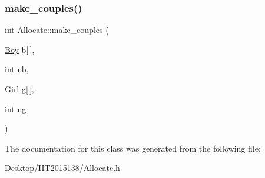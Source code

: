 \subsubsection{\texorpdfstring{make\+\_\+couples()}{make\_couples()}}
{\footnotesize\ttfamily int Allocate\+::make\+\_\+couples (\begin{DoxyParamCaption}\item[{\hyperlink{classBoy}{Boy}}]{b\mbox{[}$\,$\mbox{]},  }\item[{int}]{nb,  }\item[{\hyperlink{classGirl}{Girl}}]{g\mbox{[}$\,$\mbox{]},  }\item[{int}]{ng }\end{DoxyParamCaption})\hspace{0.3cm}{\ttfamily [inline]}}



The documentation for this class was generated from the following file\+:\begin{DoxyCompactItemize}
\item 
Desktop/\+I\+I\+T2015138/\hyperlink{Allocate_8h}{Allocate.\+h}\end{DoxyCompactItemize}
